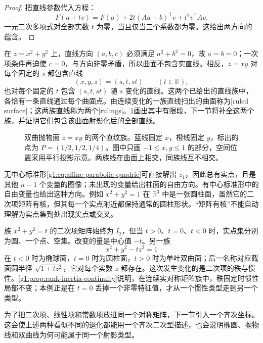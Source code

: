 \begin{proof}
	把直线参数代入方程：
	\[
		F(a+tv)=F(a)+2t(Aa+b)^{\mathsf T}v+t^2v^{\mathsf T}Av.
	\]
	一元二次多项式对全部实数 \(t\) 为零，当且仅当三个系数都为零。这给出两方向的蕴含。
\end{proof}

\begin{example}
	\label{g1:exm:paraboloid-lines}
	在 \(z=x^2+y^2\) 上，直线方向 \((a,b,c)\) 必须满足 \(a^2+b^2=0\)，故 \(a=b=0\)；一次项条件再迫使 \(c=0\)，与方向非零矛盾，所以曲面不包含实直线。相反，\(z=xy\) 对每个固定的 \(s\) 都包含直线
	\[
		(x,y,z)=(s,t,st)\qquad(t\in\mathbb R),
	\]
	也对每个固定的 \(t\) 包含 \((s,t,st)\) 随 \(s\) 变化的直线。这两个已给出的直线族中，各恰有一条直线通过每个曲面点。由连续变化的一族直线扫出的曲面称为[ruled surface]；这两族直线称为两个[rulings]。\cref{g1:fig:quadric-rulings}画出其中有限段，下一节将补全这两个族，并证明它们包含该曲面射影化后的全部直线。
\end{example}

\begin{figure}[htbp]
	\centering
	
	\caption[双曲抛物面的两个直纹族]{双曲抛物面 \(z=xy\) 的两个直纹族。蓝线固定 \(x\)，橙线固定 \(y\)，标出的点为 \(P=(1/2,1/2,1/4)\)。图中只画 \(-1\le x,y\le1\) 的部分，空间位置采用平行投影示意。两族线在曲面上相交，同族线互不相交。}
	\label{g1:fig:quadric-rulings}
\end{figure}

无中心标准形\eqref{g1:eq:affine-parabolic-quadric}可直接解出 \(z_1\)，因此总有实点，且是其他 \(n-1\) 个变量的图像；未出现的变量给出柱面的自由方向。有中心标准形中的自由变量也给出这种方向。例如 \(x^2+y^2=1\) 在 \(\mathbb R^3\) 中是一张圆柱面，虽然它的二次项矩阵有核，但其每一个实点附近都保持通常的圆柱形状。“矩阵有核”不能自动理解为实点集到处出现尖点或交叉。

\begin{example}
	\label{g1:exm:affine-quadric-degeneration}
	族 \(x^2+y^2=t\) 的二次项矩阵始终为 \(I_2\)，但当 \(t>0\)、\(t=0\)、\(t<0\) 时，实点集分别为圆、一个点、空集。改变的量是中心值 \(-t\)。另一族
	\[
		x^2+y^2-tz^2=1
	\]
	在 \(t<0\) 时为椭球面，\(t=0\) 时为圆柱面，\(t>0\) 时为单叶双曲面；后一名称对应截面圆半径 \(\sqrt{1+tz^2}\)，它对每个实数 \(z\) 都存在。这次发生变化的是二次项的秩与惯性。\cref{g1:prop:rank-inertia-continuity}说明，在连续实对称矩阵族中，秩固定时惯性局部不变；本例正是在 \(t=0\) 丢掉一个非零特征值，才从一个惯性类型走到另一个类型。
\end{example}

为了把二次项、线性项和常数项放进同一个对称矩阵，下一节引入一个齐次坐标。这会使上述两种看似不同的退化都能用一个齐次二次型描述，也会说明椭圆、抛物线和双曲线为何可能属于同一个射影类型。
